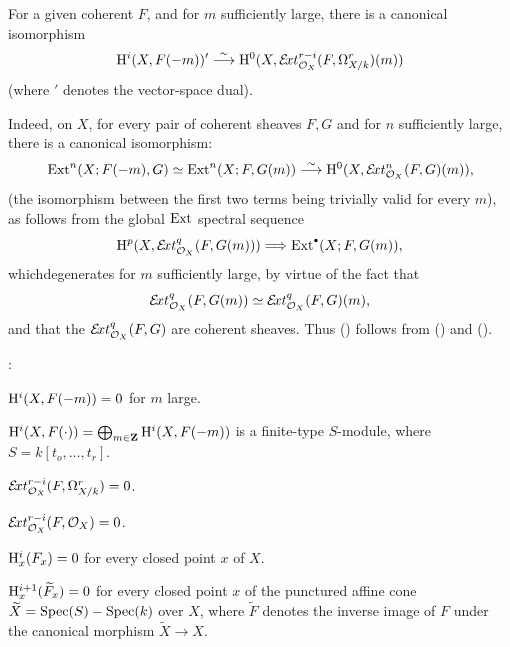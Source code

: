 \begin{corollaire} \label{XII.1.2} For a given coherent $F$, and for $m$ sufficiently large, there is a canonical isomorphism
\steco
\begin{equation} \label{eq:XII.5} {}\mathrm H^i(X, F(-m))'\overset{\sim}{\longrightarrow}\mathrm H^0(X, \mathcal E\!xt_{\mathcal O_X}^{r-i}(F, \Omega_{X/k}^r)(m))
\end{equation}
(where $'$ denotes the vector-space dual).
\end{corollaire}
Indeed, on  $X$, for every pair of coherent sheaves $F,G$ and for $n$ sufficiently large, there is a canonical isomorphism:
\steco
\begin{equation} \label{eq:XII.6} {}\operatorname{Ext}^n(X;F(-m), G)\simeq \operatorname{Ext}^n(X;F, G(m)) \overset{\sim}{\longrightarrow} \mathrm H^0(X, \mathcal E\!xt_{\mathcal O_X}^{n}(F, G)(m)),
\end{equation}
(the isomorphism between the first two terms being trivially valid for every $m$), as follows from the global $\operatorname{Ext}$ spectral sequence
\[
\H^p(X, \SheafExt^q_{\OX}(F, G(m))) \To \Ext^{\boule}(X;F, G(m)),
\]
which\pageoriginale degenerates for $m$ sufficiently large, by virtue of the fact that
\[
\mathcal E\!xt^q_{\mathcal O_X}(F, G(m)) \simeq \mathcal E\!xt^q_{\mathcal O_X}(F, G)(m),
\]
and that the $\mathcal E\!xt^q_{\mathcal O_X}(F, G)$ are coherent sheaves. Thus () follows from () and ().

\begin{corollaire} \label{XII.1.3}
:
\begin{enumeratei}
\item
$\mathrm H^i(X, F(-m))=0$ for $m$ large.
\item[\textup{(i bis)}] $\mathrm H^i(X, F(\cdot))= \bigoplus_{m\in\mathbf Z}\mathrm H^i(X, F(-m))$ is a finite-type $S$-module, where $S=k[t_o, \ldots, t_r]$.
\item
$\mathcal E\!xt^{r-i}_{\mathcal O_X}(F, \Omega_{X/k}^r)=0$.
\item[\textup{(ii bis)}] $\mathcal E\!xt^{r-i}_{\mathcal O_X}(F, \mathcal O_X)=0$.
\item
$\mathrm H^i_x(F_x)=0$ for every closed point $x$ of $X$.
\item
$\mathrm H^{i+1}_x(\widetilde{F}_x)=0$ for every closed point $x$ of the punctured affine cone $\widetilde{X}=\operatorname{Spec}(S)-\operatorname{Spec}(k)$ over $X$, where $\widetilde{F}$ denotes the inverse image of $F$ under the canonical morphism $\widetilde{X}\to X$.
\end{enumeratei}
\end{corollaire}

